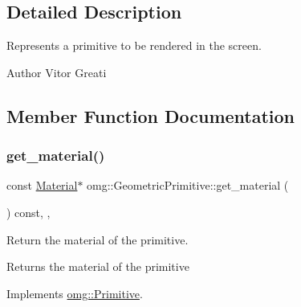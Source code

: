\subsection{Detailed Description}
Represents a primitive to be rendered in the screen. 

\begin{DoxyAuthor}{Author}
Vitor Greati 
\end{DoxyAuthor}


\subsection{Member Function Documentation}
\mbox{\label{classomg_1_1_geometric_primitive_ae7b7b9ed0a5fc336a3111ef16a09f27a}} 
\subsubsection{\texorpdfstring{get\_material()}{get\_material()}}
{\footnotesize\ttfamily const \mbox{\hyperlink{classomg_1_1_material}{Material}}$\ast$ omg\+::\+Geometric\+Primitive\+::get\+\_\+material (\begin{DoxyParamCaption}{ }\end{DoxyParamCaption}) const\hspace{0.3cm}{\ttfamily [inline]}, {\ttfamily [override]}, {\ttfamily [virtual]}}



Return the material of the primitive. 

\begin{DoxyReturn}{Returns}
the material of the primitive 
\end{DoxyReturn}


Implements \mbox{\hyperlink{classomg_1_1_primitive_ad9cb98c6f74581d53cadf800fc506333}{omg\+::\+Primitive}}.

\mbox{\label{classomg_1_1_geometric_primitive_a21bc48f971cbc94b60791906f20bc925}} 
